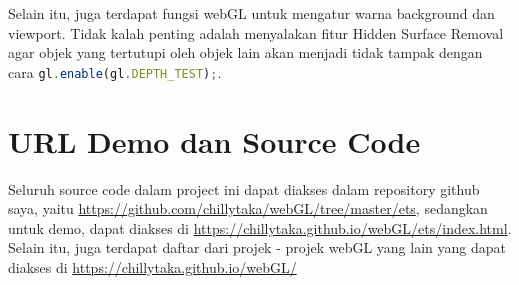 Selain itu, juga terdapat fungsi webGL untuk mengatur warna background dan viewport. Tidak kalah penting adalah menyalakan fitur Hidden Surface Removal agar objek yang tertutupi oleh objek lain akan menjadi tidak tampak dengan cara \lstinline[language=javascript]{gl.enable(gl.DEPTH_TEST);}.

\section*{URL Demo dan Source Code}
Seluruh source code dalam project ini dapat diakses dalam repository github saya, yaitu \url{https://github.com/chillytaka/webGL/tree/master/ets}, sedangkan untuk demo, dapat diakses di \url{https://chillytaka.github.io/webGL/ets/index.html}. Selain itu, juga terdapat daftar dari projek - projek webGL yang lain yang dapat diakses di \url{https://chillytaka.github.io/webGL/}
